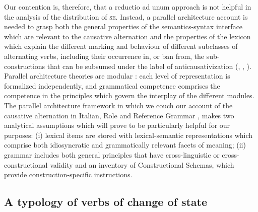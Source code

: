 \documentclass[output=paper,colorlinks,citecolor=brown
]{langscibook}
\begin{document}
Our contention is, therefore, that a reductio ad unum approach is not helpful in the analysis of the distribution of \textsc{se}. Instead, a parallel architecture account is needed to grasp both the general properties of the semantics-syntax interface which are relevant to the causative alternation and the properties of the lexicon which explain the different marking and behaviour of different subclasses of alternating verbs, including their occurrence in, or ban from, the sub-constructions that can be subsumed under the label of anticausativization (, , ). Parallel architecture theories are modular \citep{jackendoff2002foundations}: each level of representation is formalized independently, and grammatical competence comprises the competence in the principles which govern the interplay of the different modules. The parallel architecture framework in which we couch our account of the causative alternation in Italian, Role and Reference Grammar \citep[and references therein]{vanvalin2023principles}, makes two analytical assumptions which will prove to be particularly helpful for our purposes: (i) lexical items are stored with lexical-semantic representations which comprise both idiosyncratic and grammatically relevant facets of meaning; (ii) grammar includes both general principles that have cross-linguistic or cross-constructional validity and an inventory of Constructional Schemas, which provide construction-specific instructions. 

\subsection{A typology of verbs of change of state}
\label{bentley_section_5.2}
\end{document}
